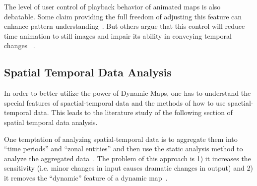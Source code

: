 \documentclass[hidelinks,12pt]{article}
\newcommand{\grey}[1]{\textcolor{black!30}{#1}}
\begin{document}
The level of user control of playback behavior of animated maps is
also debatable. Some claim providing the full freedom of adjusting
this feature can enhance pattern understanding~\cite{Nelson1998}. But
others argue that this control will reduce time animation to still
images and impair its ability in conveying temporal changes
~\cite{Lowe2004}.

\begin{comment}
The technology of implementing a dynamic map has been exceeding the
cartographic theory~\cite{Harrower2008}. This makes the design of
Dynamic Maps even more challenging. Animated maps are not superior to
static maps, it is just they are good at different aspect of
information convey. The animated map is advantageous in demonstrating
the changes between frames rather than the absolute value represented
in each frame~\cite{Dorling1992}. It is proved to be more powerful in
convey the spatial-temporal pattern than static
map~\cite{McEachern1998}.

``Data Visualization with Spacetime Maps'', Richard L. Brownrigg, 2005
(read further later on)

\grey{To be continued later:
\begin{enumerate}[label*=\arabic*.]
\item ``Geographic Visualization: Designing Manipulable Maps for
    Exploring Temporally Varying Georeferenced Statistics'', MacEachren et al.\
\item ``Strategies for the Visualization of Geographic Time-Series
    Data'', Mark Monmonier, 2011
\item ``Evaluation of Methods for Classifying Epidemiological Data
    on Choropleth Maps in Series'', Brewer and Pickle, 2002
\end{enumerate}}
\end{comment}

\subsection{Spatial Temporal Data Analysis}\label{stDataAnalysis}
In order to better utilize the power of Dynamic Maps, one has to
understand the special features of spactial-temporal data and the
methods of how to use spactial-temporal data. This leads to the
literature study of the following section of spatial temporal data
analysis.

One temptation of analyzing spatial-temporal data is to aggregate them
into ``time periods'' and ``zonal entities'' and then use the static
analysis method to analyze the aggregated data~\cite{Dorling1992}. The
problem of this approach is 1) it increases the sensitivity
(i.e. minor changes in input causes dramatic changes in output) and 2)
it removes the ``dynamic'' feature of a dynamic
map~\cite{Dorling1992}.
\end{document}
